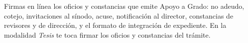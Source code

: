 \documentclass[11pt,a4paper]{article}
\begin{document}
{\small\tableofcontents}
\newpage
\begin{quevasahacer}
Firmas en línea los oficios y constancias que emite Apoyo a Grado: no adeudo, cotejo, invitaciones al sínodo, acuse, notificación al director, constancias de revisores y de dirección, y el formato de integración de expediente. En la modalidad \emph{Tesis} te toca firmar los oficios y constancias del trámite.
\end{quevasahacer}




\end{document}
